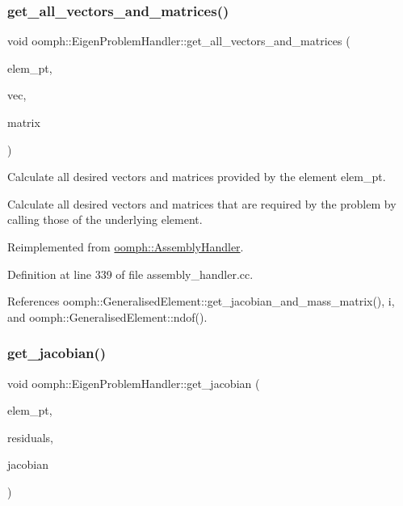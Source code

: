 \subsubsection{\texorpdfstring{get\+\_\+all\+\_\+vectors\+\_\+and\+\_\+matrices()}{get\_all\_vectors\_and\_matrices()}}
{\footnotesize\ttfamily void oomph\+::\+Eigen\+Problem\+Handler\+::get\+\_\+all\+\_\+vectors\+\_\+and\+\_\+matrices (\begin{DoxyParamCaption}\item[{\hyperlink{classoomph_1_1GeneralisedElement}{Generalised\+Element} $\ast$const \&}]{elem\+\_\+pt,  }\item[{\hyperlink{classoomph_1_1Vector}{Vector}$<$ \hyperlink{classoomph_1_1Vector}{Vector}$<$ double $>$ $>$ \&}]{vec,  }\item[{\hyperlink{classoomph_1_1Vector}{Vector}$<$ \hyperlink{classoomph_1_1DenseMatrix}{Dense\+Matrix}$<$ double $>$ $>$ \&}]{matrix }\end{DoxyParamCaption})\hspace{0.3cm}{\ttfamily [virtual]}}



Calculate all desired vectors and matrices provided by the element elem\+\_\+pt. 

Calculate all desired vectors and matrices that are required by the problem by calling those of the underlying element. 

Reimplemented from \hyperlink{classoomph_1_1AssemblyHandler_ab2e4ee4623116b18245ca90cfe9ba144}{oomph\+::\+Assembly\+Handler}.



Definition at line 339 of file assembly\+\_\+handler.\+cc.



References oomph\+::\+Generalised\+Element\+::get\+\_\+jacobian\+\_\+and\+\_\+mass\+\_\+matrix(), i, and oomph\+::\+Generalised\+Element\+::ndof().

\mbox{\label{classoomph_1_1EigenProblemHandler_aaaf7c3aa3713030ff4859117941b3a39}} 
\subsubsection{\texorpdfstring{get\+\_\+jacobian()}{get\_jacobian()}}
{\footnotesize\ttfamily void oomph\+::\+Eigen\+Problem\+Handler\+::get\+\_\+jacobian (\begin{DoxyParamCaption}\item[{\hyperlink{classoomph_1_1GeneralisedElement}{Generalised\+Element} $\ast$const \&}]{elem\+\_\+pt,  }\item[{\hyperlink{classoomph_1_1Vector}{Vector}$<$ double $>$ \&}]{residuals,  }\item[{\hyperlink{classoomph_1_1DenseMatrix}{Dense\+Matrix}$<$ double $>$ \&}]{jacobian }\end{DoxyParamCaption})\hspace{0.3cm}{\ttfamily [virtual]}}



